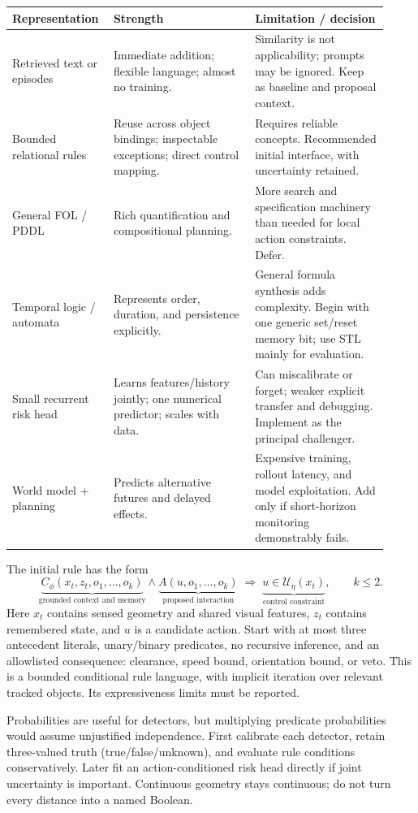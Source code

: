 \documentclass[10pt]{article}
\begin{document}
\begin{tabular}{p{0.22\linewidth}p{0.36\linewidth}p{0.34\linewidth}}
\toprule
Representation & Strength & Limitation / decision\\\midrule
Retrieved text or episodes & Immediate addition; flexible language; almost no training. & Similarity is not applicability; prompts may be ignored. Keep as baseline and proposal context.\\
Bounded relational rules & Reuse across object bindings; inspectable exceptions; direct control mapping. & Requires reliable concepts. Recommended initial interface, with uncertainty retained.\\
General FOL / PDDL & Rich quantification and compositional planning. & More search and specification machinery than needed for local action constraints. Defer.\\
Temporal logic / automata & Represents order, duration, and persistence explicitly. & General formula synthesis adds complexity. Begin with one generic set/reset memory bit; use STL mainly for evaluation.\\
Small recurrent risk head & Learns features/history jointly; one numerical predictor; scales with data. & Can miscalibrate or forget; weaker explicit transfer and debugging. Implement as the principal challenger.\\
World model + planning & Predicts alternative futures and delayed effects. & Expensive training, rollout latency, and model exploitation. Add only if short-horizon monitoring demonstrably fails.\\
\bottomrule
\end{tabular}

The initial rule has the form
\[
\underbrace{C_\phi(x_t,z_t,o_1,\ldots,o_k)}_{\text{grounded context and memory}}
\wedge\underbrace{A(u,o_1,\ldots,o_k)}_{\text{proposed interaction}}
\;\Rightarrow\; \underbrace{u\in\mathcal U_{\eta}(x_t)}_{\text{control constraint}},\qquad k\leq2.
\]
Here $x_t$ contains sensed geometry and shared visual features, $z_t$ contains remembered state, and $u$ is a candidate action. Start with at most three antecedent literals, unary/binary predicates, no recursive inference, and an allowlisted consequence: clearance, speed bound, orientation bound, or veto. This is a bounded conditional rule language, with implicit iteration over relevant tracked objects. Its expressiveness limits must be reported.

Probabilities are useful for detectors, but multiplying predicate probabilities would assume unjustified independence. First calibrate each detector, retain three-valued truth (true/false/unknown), and evaluate rule conditions conservatively. Later fit an action-conditioned risk head directly if joint uncertainty is important. Continuous geometry stays continuous; do not turn every distance into a named Boolean.
\end{document}
